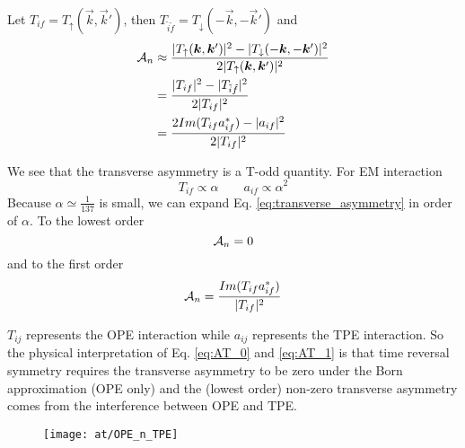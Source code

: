 Let $T_{if} = T_{\uparrow}(\vec{k}, \vec{k}')$, then $T_{\tilde{i}\tilde{f}} = T_\downarrow (-\vec{k}, -\vec{k}')$
and
\begin{equation}
    \begin{aligned}
	\mathcal{A}_n &\approx \frac{|T_{\uparrow}(\boldsymbol{k}, \boldsymbol{k}')|^2 - |T_{\downarrow}(-\boldsymbol{k}, -\boldsymbol{k}')|^2}{2|T_{\uparrow}(\boldsymbol{k}, \boldsymbol{k}')|^2} \\
	    &= \frac{|T_{if}|^2 - |T_{\tilde{i}\tilde{f}}|^2}{2|T_{if}|^2}  \\
	    &= \frac{2Im(T_{if}a^*_{if}) - |a_{if}|^2}{2|T_{if}|^2}
    \end{aligned}
    \label{eq:transverse_asymmetry}
\end{equation}

We see that the transverse asymmetry is a T-odd quantity. For EM interaction
\begin{equation}
    T_{if} \propto \alpha \qquad a_{if} \propto \alpha^2
\end{equation}
Because $\alpha \simeq \frac{1}{137}$ is small, we can expand Eq. \ref{eq:transverse_asymmetry} 
in order of $\alpha$. To the lowest order
\begin{equation}
    \mathcal{A}_n = 0
    \label{eq:AT_0}
\end{equation}
and to the first order 
\begin{equation}
    \mathcal{A}_n = \frac{Im(T_{if}a^*_{if})}{|T_{if}|^2}
    \label{eq:AT_1}
\end{equation}

$T_{ij}$ represents the OPE interaction while $a_{ij}$ represents
the TPE interaction. So the physical interpretation of
Eq. \ref{eq:AT_0} and \ref{eq:AT_1} is that time reversal symmetry requires 
the transverse asymmetry to be zero under the Born approximation (OPE only)
and the (lowest order) non-zero transverse asymmetry comes from the interference 
between OPE and TPE.
\begin{figure}[h!]
    \centering
    \texttt{[image: at/OPE\_n\_TPE]}
\end{figure}

